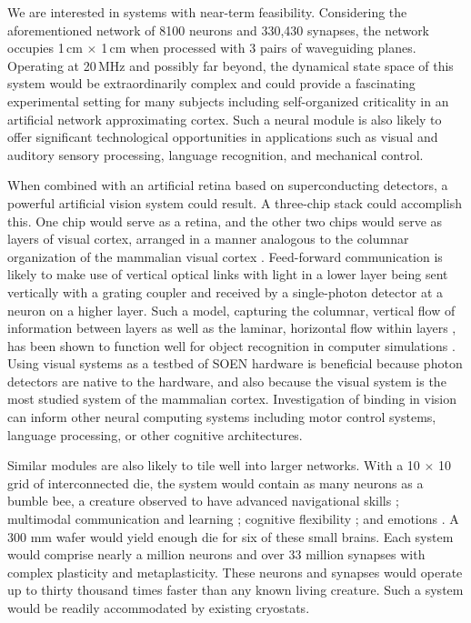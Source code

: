 \documentclass[aip,amsmath,amssymb,reprint,nofootinbib]{revtex4-1}
\begin{document}
We are interested in systems with near-term feasibility. Considering the aforementioned network of 8100 neurons and 330,430 synapses, the network occupies 1\,cm $\times$ 1\,cm when processed with 3 pairs of waveguiding planes. Operating at 20\,MHz and possibly far beyond, the dynamical state space of this system would be extraordinarily complex and could provide a fascinating experimental setting for many subjects including self-organized criticality \cite{be2007,kism2009,shya2009,ch2010,rusp2011} in an artificial network approximating cortex. Such a neural module is also likely to offer significant technological opportunities in applications such as visual and auditory sensory processing, language recognition, and mechanical control.  

When combined with an artificial retina based on superconducting detectors, a powerful artificial vision system could result. A three-chip stack could accomplish this. One chip would serve as a retina, and the other two chips would serve as layers of visual cortex, arranged in a manner analogous to the columnar organization of the mammalian visual cortex \cite{mo1997}. Feed-forward communication is likely to make use of vertical optical links with light in a lower layer being sent vertically with a grating coupler and received by a single-photon detector at a neuron on a higher layer. Such a model, capturing the columnar, vertical flow of information between layers as well as the laminar, horizontal flow within layers \cite{lued1997,spto2000,brto2006}, has been shown to function well for object recognition in computer simulations \cite{haah2017}. Using visual systems as a testbed of SOEN hardware is beneficial because photon detectors are native to the hardware, and also because the visual system is the most studied system of the mammalian cortex. Investigation of binding in vision \cite{ro1999,tr1999,woca1999,vala2001,enfr2001,haah2017} can inform other neural computing systems including motor control systems, language processing, or other cognitive architectures.

Similar modules are also likely to tile well into larger networks. With a 10 $\times$ 10 grid of interconnected die, the system would contain as many neurons as a bumble bee, a creature observed to have advanced navigational skills \cite{chmi2014}; multimodal communication and learning \cite{alpe2016}; cognitive flexibility \cite{lope2017}; and emotions \cite{peba2016}. A 300 mm wafer would yield enough die for six of these small brains. Each system would comprise nearly a million neurons and over 33 million synapses with complex plasticity and metaplasticity. These neurons and synapses would operate up to thirty thousand times faster than any known living creature. Such a system would be readily accommodated by existing cryostats.  
\end{document}
